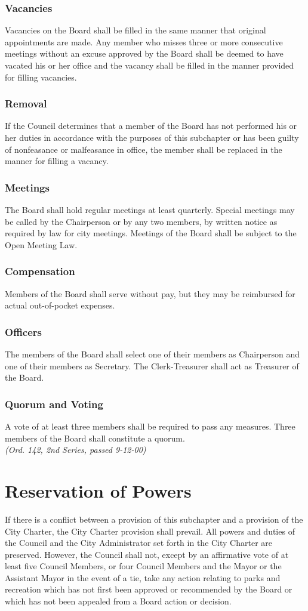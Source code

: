 \subsubsection{Vacancies}
Vacancies on the Board shall be filled in the same manner that original appointments are made. Any member who misses three or more consecutive meetings without an excuse approved by the Board shall be deemed to have vacated his or her office and the vacancy shall be filled in the manner provided for filling vacancies.
\subsubsection{Removal}
If the Council determines that a member of the Board has not performed his or her duties in accordance with the purposes of this subchapter or has been guilty of nonfeasance or malfeasance in office, the member shall be replaced in the manner for filling a vacancy.
\subsubsection{Meetings}
The Board shall hold regular meetings at least quarterly.  Special meetings may be called by the Chairperson or by any two members, by written notice as required by law for city meetings.  Meetings of the Board shall be subject to the Open Meeting Law.
\subsubsection{Compensation}
Members of the Board shall serve without pay, but they may be reimbursed for actual out-of-pocket expenses.
\subsubsection{Officers}
The members of the Board shall select one of their members as Chairperson and one of their members as Secretary.  The Clerk-Treasurer shall act as Treasurer of the Board.
\subsubsection{Quorum and Voting}
A vote of at least three members shall be required to pass any measures.  Three members of the Board shall constitute a quorum.\\
\emph{(Ord. 142, 2nd Series, passed 9-12-00)}
\section{Reservation of Powers}
If there is a conflict between a provision of this subchapter and a provision of the City Charter, the City Charter provision shall prevail.  All powers and duties of the Council and the City Administrator set forth in the City Charter are preserved. However, the Council shall not, except by an affirmative vote of at least five Council Members, or four Council Members and the Mayor or the Assistant Mayor in the event of a tie, take any action relating to parks and recreation which has not first been approved or recommended by the Board or which has not been appealed from a Board action or decision.
